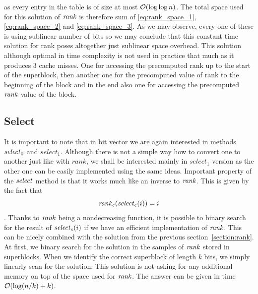 as every entry in the table is of size at most $\mathcal{O}(\log\log n)$. The total space used for
this solution of $\mathit{rank}$ is therefore sum of \ref{eq:rank_space_1}, \ref{eq:rank_space_2} and
\ref{eq:rank_space_3}. As we may observe, every one of these is using sublinear number of bits so
we may conclude that this constant time solution for rank poses altogether just sublinear space overhead.
This solution although optimal in time complexity is not used in practice that much as it produces
3 cache misses. One for accessing the precomputed rank up to the start of the superblock, then
another one for the precomputed value of rank to the beginning of the block and in the end also one
for accessing the precomputed $\mathit{rank}$ value of the block.


\subsection{Select}
\label{section:select}

It is important to note that in bit vector we are again interested in methods $\mathit{select}_0$
and $select_1$. Although there is not a simple way how to convert one to another just like with
$rank$, we shall be interested mainly in $select_1$ version as the other one can be easily
implemented using the same ideas. Important property of the $\mathit{select}$ method is that it
works much like an inverse to $\mathit{rank}$. This is given by the fact that
                $$\mathit{rank}_c(\mathit{select}_c(i)) = i$$.
Thanks to $\mathit{rank}$ being a nondecreasing function, it is possible to binary search for the result
of $\mathit{select}_c(i)$ if we have an efficient implementation of $\mathit{rank}$. This can be nicely combined
with the solution from the previous section~\ref{section:rank}. At first, we binary search for
the solution in the samples of $\mathit{rank}$ stored in superblocks. When we identify the correct
superblock of length $k$ bits, we simply linearly scan for the solution. This solution is not
asking for any additional memory on top of the space used for $\mathit{rank}$. The answer can be given
in time $\mathcal{O}(\log(n/k)+k)$.

